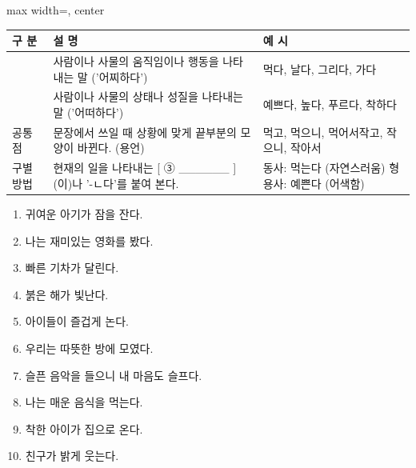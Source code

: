 \documentclass[fs85,seriesRus]{korfarm-base}
\begin{document}
\par\medskip{}
\noindent\begin{adjustbox}{max width=\linewidth, center}
\renewcommand{\arraystretch}{1.45}
\begin{tabular}{|>{\raggedright\arraybackslash}p{}|>{\raggedright\arraybackslash}p{}|>{\raggedright\arraybackslash}p{}|}
\hline
\rowcolor{kfPrimaryLight!50}\textbf{\color{kfPrimary} 구 분} & \textbf{\color{kfPrimary} 설 명} & \textbf{\color{kfPrimary} 예 시} \\\hline
[ ① \_\_\_\_\_\_ ] & 사람이나 사물의 움직임이나 행동을 나타내는 말 ('어찌하다') & 먹다, 날다, 그리다, 가다 \\\hline
[ ② \_\_\_\_\_\_ ] & 사람이나 사물의 상태나 성질을 나타내는 말 ('어떠하다') & 예쁘다, 높다, 푸르다, 착하다 \\\hline
공통점 & 문장에서 쓰일 때 상황에 맞게 끝부분의 모양이 바뀐다. (용언) & 먹고, 먹으니, 먹어서작고, 작으니, 작아서 \\\hline
구별 방법 & 현재의 일을 나타내는 [ ③ \_\_\_\_\_\_ ] (이)나 '-ㄴ다'를 붙여 본다. & 동사: 먹는다 (자연스러움) 형용사: 예쁜다 (어색함) \\\hline
\end{tabular}
\end{adjustbox}\par\medskip

\kfActivityBg {}
\par{}\par\nopagebreak[4]\smallskip\nopagebreak[4]
\kfBeginMC
\begin{enumerate}[leftmargin=22pt, itemsep=6pt, topsep=4pt, label=\textbf{\arabic*.}]
\item 귀여운 아기가 잠을 잔다.
\item 나는 재미있는 영화를 봤다.
\item 빠른 기차가 달린다.
\item 붉은 해가 빛난다.
\item 아이들이 즐겁게 논다.
\item 우리는 따뜻한 방에 모였다.
\item 슬픈 음악을 들으니 내 마음도 슬프다.
\item 나는 매운 음식을 먹는다.
\item 착한 아이가 집으로 온다.
\item 친구가 밝게 웃는다.
\end{enumerate}
\kfEndMC
\end{document}
